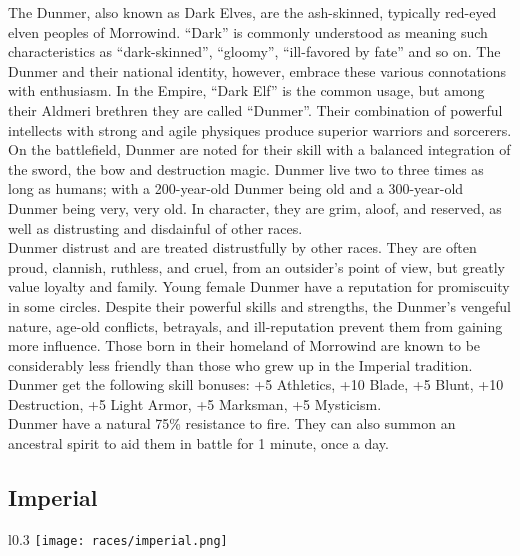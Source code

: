 The Dunmer, also known as Dark Elves, are the ash-skinned, typically red-eyed elven peoples of Morrowind. ``Dark'' is commonly understood as meaning such characteristics as ``dark-skinned'', ``gloomy'', ``ill-favored by fate'' and so on. The Dunmer and their national identity, however, embrace these various connotations with enthusiasm. In the Empire, ``Dark Elf'' is the common usage, but among their Aldmeri brethren they are called ``Dunmer''. Their combination of powerful intellects with strong and agile physiques produce superior warriors and sorcerers. On the battlefield, Dunmer are noted for their skill with a balanced integration of the sword, the bow and destruction magic. Dunmer live two to three times as long as humans; with a 200-year-old Dunmer being old and a 300-year-old Dunmer being very, very old. In character, they are grim, aloof, and reserved, as well as distrusting and disdainful of other races.\\

Dunmer distrust and are treated distrustfully by other races. They are often proud, clannish, ruthless, and cruel, from an outsider's point of view, but greatly value loyalty and family. Young female Dunmer have a reputation for promiscuity in some circles. Despite their powerful skills and strengths, the Dunmer's vengeful nature, age-old conflicts, betrayals, and ill-reputation prevent them from gaining more influence. Those born in their homeland of Morrowind are known to be considerably less friendly than those who grew up in the Imperial tradition.\\

Dunmer get the following skill bonuses: +5 Athletics, +10 Blade, +5 Blunt, +10 Destruction, +5 Light Armor, +5 Marksman, +5 Mysticism.\\

Dunmer have a natural 75\% resistance to fire. They can also summon an ancestral spirit to aid them in battle for 1 minute, once a day.

\newpage %
\subsection{Imperial}
\begin{wrapfigure}{l}{0.3\textwidth}
	\texttt{[image: races/imperial.png]}
\end{wrapfigure}

